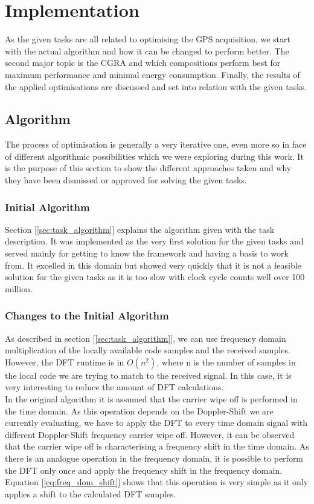\chapter{Implementation} %
\label{cha:impl}
	As the given tasks are all related to optimising the GPS acquisition, we start with the actual algorithm and how it can be changed to perform better. The second major topic is the CGRA and which compositions perform best for maximum performance and minimal energy consumption. Finally, the results of the applied optimisations are discussed and set into relation with the given tasks.

	\section{Algorithm} %
	\label{sec:impl_algorithmic_changes}
		The process of optimisation is generally a very iterative one, even more so in face of different algorithmic possibilities which we were exploring during this work. It is the purpose of this section to show the different approaches taken and why they have been dismissed or approved for solving the given tasks.

		\subsection{Initial Algorithm} %
		\label{sub:initial_algorithm}
			Section [\ref{sec:task_algorithm}] explains the algorithm given with the task description. It was implemented as the very first solution for the given tasks and served mainly for getting to know the framework and having a basis to work from. It excelled in this domain but showed very quickly that it is not a feasible solution for the given tasks as it is too slow with clock cycle counts well over \num{100} million. 

		\subsection{Changes to the Initial Algorithm} %
		\label{sub:changes_to_the_initial_algorithm}
			As described in section [\ref{sec:task_algorithm}], we can use frequency domain multiplication of the locally available code samples and the received samples. However, the DFT runtime is in $O(n^2)$, where n is the number of samples in the local code we are trying to match to the received signal. In this case, it is very interesting to reduce the amount of DFT calculations.\\
			In the original algorithm it is assumed that the carrier wipe off is performed in the time domain. As this operation depends on the Doppler-Shift we are currently evaluating, we have to apply the DFT to every time domain signal with different Doppler-Shift frequency carrier wipe off. However, it can be observed that the carrier wipe off is characterising a frequency shift in the time domain. As there is an analogue operation in the frequency domain, it is possible to perform the DFT only once and apply the frequency shift in the frequency domain. Equation [\ref{eq:freq_dom_shift}] shows that this operation is very simple as it only applies a shift to the calculated DFT samples.

